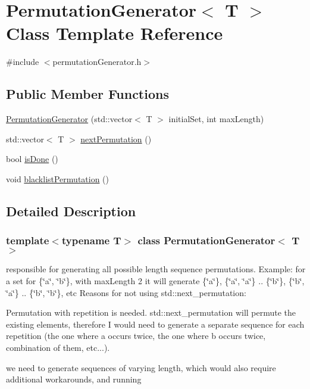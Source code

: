 \hypertarget{classPermutationGenerator}{}\section{Permutation\+Generator$<$ T $>$ Class Template Reference}
\label{classPermutationGenerator}


{\ttfamily \#include $<$permutation\+Generator.\+h$>$}

\subsection*{Public Member Functions}
\begin{DoxyCompactItemize}
\item 
\hyperlink{classPermutationGenerator_a8bd348f28ef2830e335056f877246244}{Permutation\+Generator} (std\+::vector$<$ T $>$ initial\+Set, int max\+Length)
\item 
std\+::vector$<$ T $>$ \hyperlink{classPermutationGenerator_a504d17b77c3289e19e95f2b60e8db24d}{next\+Permutation} ()
\item 
bool \hyperlink{classPermutationGenerator_a4bee28112c8dece4337c9d65949216c6}{is\+Done} ()
\item 
void \hyperlink{classPermutationGenerator_a7d5c9dcbe711a74de2ac73ef128a52c9}{blacklist\+Permutation} ()
\end{DoxyCompactItemize}


\subsection{Detailed Description}
\subsubsection*{template$<$typename T$>$\newline
class Permutation\+Generator$<$ T $>$}

responsible for generating all possible length sequence permutations. Example\+: for a set for \{\char`\"{}a\char`\"{}, \char`\"{}b\char`\"{}\}, with max\+Length 2 it will generate \{\char`\"{}a\char`\"{}\}, \{\char`\"{}a\char`\"{}, \char`\"{}a\char`\"{}\} .. \{\char`\"{}b\char`\"{}\}, \{\char`\"{}b\char`\"{}, \char`\"{}a\char`\"{}\} .. \{\char`\"{}b\char`\"{}, \char`\"{}b\char`\"{}\}, etc Reasons for not using std\+::next\+\_\+permutation\+:
\begin{DoxyEnumerate}
\item Permutation with repetition is needed. std\+::next\+\_\+permutation will permute the existing elements, therefore I would need to generate a separate sequence for each repetition (the one where a occurs twice, the one where b occurs twice, combination of them, etc...).
\item we need to generate sequences of varying length, which would also require additional workarounds, and running
\end{DoxyEnumerate}

